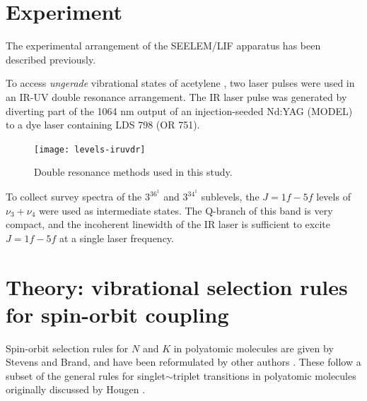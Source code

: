 \documentclass[12pt]{mitthesis}
\begin{document}
\section{Experiment}



The experimental arrangement of the SEELEM/LIF apparatus has been
described previously.


To access \emph{ungerade} vibrational states of acetylene \astate, two
laser pulses were used in an IR-UV double resonance arrangement.  The
IR laser pulse was generated by diverting part of the 1064 nm output
of an injection-seeded Nd:YAG (MODEL) to a dye laser containing LDS
798 (OR 751).



\begin{figure}
  \caption{Double resonance methods used in this study.}
  \label{fig:levels-k1}
  \centering

  \texttt{[image: levels-iruvdr]}
\end{figure}


To collect survey spectra of the $3^36^1$ and $3^34^1$ 
sublevels, the $J=1f-5f$ levels of \xstate\ $\nu_3+\nu_4$
were used as intermediate states.  The Q-branch of this band is very
compact, and the incoherent linewidth of the IR laser is sufficient to
excite $J=1f-5f$ at a single laser frequency.



\section{Theory: vibrational selection rules for spin-orbit coupling}

  Spin-orbit selection rules for $N$ and $K$ in
polyatomic molecules are given by Stevens and Brand, and have been
reformulated by other authors \cite{stevens73, howard78, dupre84}.
These follow a subset of the general rules for singlet$\sim$triplet
transitions in polyatomic molecules originally discussed by Hougen
\cite{hougen64}.
\end{document}
